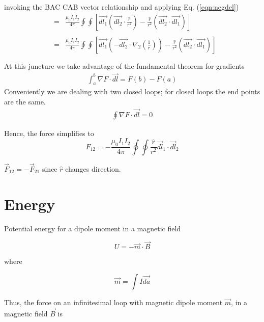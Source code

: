 \documentclass[12pt]{revtex4}
\begin{document}
invoking the BAC CAB vector relationship and applying Eq. (\ref{eqn:negdel})
\begin{eqnarray*} 
&=&\frac{\mu_{0}I_{1}I_{2}  }{4\pi} \oint \oint \left[\vec{dl_{1}}(\vec{dl_{2}} \cdot \frac{\hat{r}}{r^{2}})-\frac{\hat{r}}{r^{2}}(\vec{dl_{2}} \cdot \vec{dl_{1}})\right]\\  \\ 
&=&\frac{\mu_{0}I_{1}I_{2}  }{4\pi} \oint \oint \left[ \vec{dl_{1}}(-\vec{dl_{2}} \cdot \nabla_2( \frac{1}{r}))-\frac{\hat{r}}{r^{2}}(\vec{dl_{2}} \cdot \vec{dl_{1}}) \right] \\  \\ 
\end{eqnarray*}
At this juncture we take advantage of the fundamental theorem for gradients
\begin{eqnarray*}
\int_{a}^{b} \nabla F \cdot \vec{dl}=F(b)-F(a)
\end{eqnarray*}
Conveniently we are dealing with two closed loops; for closed loops the end points are the same. 
\begin{eqnarray*}
\oint \nabla F \cdot \vec{dl}=0
\end{eqnarray*}

Hence, the force simplifies to 
\begin{equation}
F_{12}=- \frac{\mu_{0} I_{1}I_{2}}{4\pi} \oint \oint \frac{\hat{r}}{r^{2}}  \vec{dl}_{1} \cdot \vec{dl}_{2}\label{eqn:forceloop}
\end{equation}

$\vec{F}_{12}=-\vec{F}_{21}$ since $\hat{r}$ changes direction.







\section{Energy}

Potential energy for a dipole moment in a magnetic field 

\begin{equation}
\label{potential }
U=-\vec{m} \cdot \vec{B}
\end{equation}

where 

\begin{equation}
\label{dipole}
\vec{m} =\int I \vec{da}
\end{equation}

Thus, the force on an infinitesimal loop with magnetic dipole moment $\vec{m}$, in a magnetic field $\vec{B}$ is 
\end{document}
